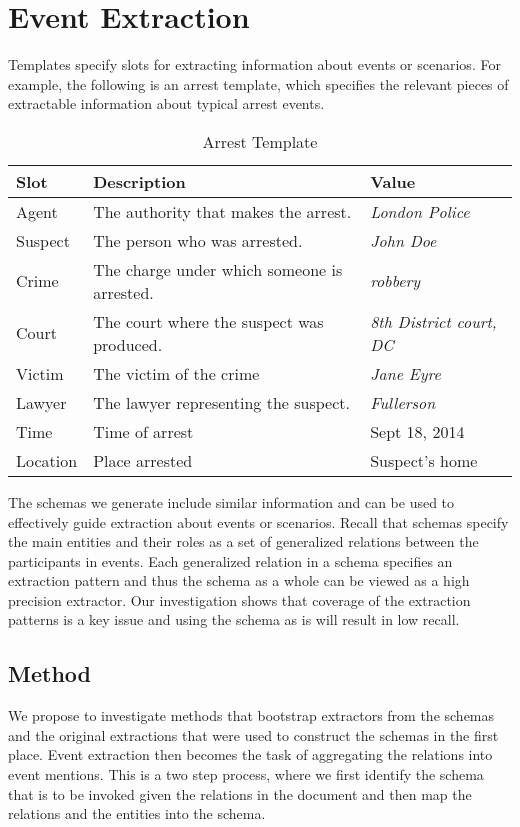 \section{Event Extraction}

Templates specify slots for extracting information about events or scenarios. For example, the following is an arrest template, which specifies the relevant pieces of extractable information about typical arrest events. 
\begin{table}[htdp]
\begin{center}
\begin{tabular}{|p{2cm}|p{8cm}|p{4cm}|}
\hline
Slot & Description & Value\\
\hline
Agent & The authority that makes the arrest. & {\em London Police}\\
Suspect & The person who was arrested. & {\em John Doe}\\
Crime & The charge under which someone is arrested. & {\em robbery}\\
Court  & The court where the suspect was produced. & {\em 8th District court, DC} \\ 
Victim & The victim of the crime & {\em Jane Eyre}\\
Lawyer & The lawyer representing the suspect. & {\em Fullerson}\\
\hline
Time & Time of arrest & Sept 18, 2014\\
Location & Place arrested & Suspect's home\\
\hline
\end{tabular}
\caption{Arrest Template}
\end{center}
\label{default}
\end{table}%

The schemas we generate include similar information and can be used to effectively guide extraction about events or scenarios. Recall that schemas specify the main entities and their roles as a set of generalized relations between the participants in events. Each generalized relation in a schema specifies an extraction pattern and thus the schema as a whole can be viewed as a high precision extractor. Our investigation shows that coverage of the extraction patterns is a key issue and using the schema as is will result in low recall. 

\subsection{Method}
We propose to investigate methods that bootstrap extractors from the schemas and the original extractions that were used to construct the schemas in the first place. Event extraction then becomes the task of aggregating the relations into event mentions. This is a two step process, where we first identify the schema that is to be invoked given the relations in the document and then map the relations and the entities into the schema. 

